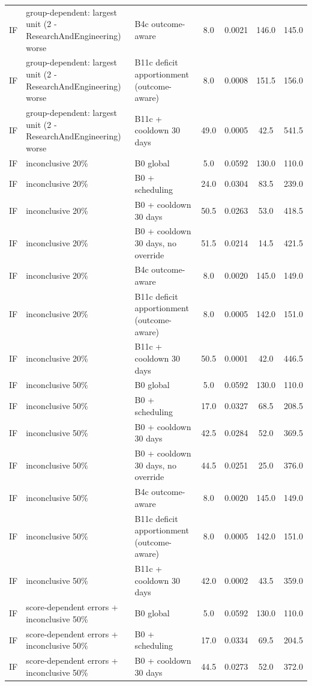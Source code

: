\documentclass[10pt,onecolumn,letterpaper]{article}
\begin{document}
\begin{longtable}{lp{5.2cm}p{4.4cm}cccc}
IF & group-dependent: largest unit (2 - ResearchAndEngineering) worse & B4c outcome-aware & 8.0 & 0.0021 & 146.0 & 145.0 \\
IF & group-dependent: largest unit (2 - ResearchAndEngineering) worse & B11c deficit apportionment (outcome-aware) & 8.0 & 0.0008 & 151.5 & 156.0 \\
IF & group-dependent: largest unit (2 - ResearchAndEngineering) worse & B11c + cooldown 30 days & 49.0 & 0.0005 & 42.5 & 541.5 \\
IF & inconclusive 20\% & B0 global & 5.0 & 0.0592 & 130.0 & 110.0 \\
IF & inconclusive 20\% & B0 + scheduling & 24.0 & 0.0304 & 83.5 & 239.0 \\
IF & inconclusive 20\% & B0 + cooldown 30 days & 50.5 & 0.0263 & 53.0 & 418.5 \\
IF & inconclusive 20\% & B0 + cooldown 30 days, no override & 51.5 & 0.0214 & 14.5 & 421.5 \\
IF & inconclusive 20\% & B4c outcome-aware & 8.0 & 0.0020 & 145.0 & 149.0 \\
IF & inconclusive 20\% & B11c deficit apportionment (outcome-aware) & 8.0 & 0.0005 & 142.0 & 151.0 \\
IF & inconclusive 20\% & B11c + cooldown 30 days & 50.5 & 0.0001 & 42.0 & 446.5 \\
IF & inconclusive 50\% & B0 global & 5.0 & 0.0592 & 130.0 & 110.0 \\
IF & inconclusive 50\% & B0 + scheduling & 17.0 & 0.0327 & 68.5 & 208.5 \\
IF & inconclusive 50\% & B0 + cooldown 30 days & 42.5 & 0.0284 & 52.0 & 369.5 \\
IF & inconclusive 50\% & B0 + cooldown 30 days, no override & 44.5 & 0.0251 & 25.0 & 376.0 \\
IF & inconclusive 50\% & B4c outcome-aware & 8.0 & 0.0020 & 145.0 & 149.0 \\
IF & inconclusive 50\% & B11c deficit apportionment (outcome-aware) & 8.0 & 0.0005 & 142.0 & 151.0 \\
IF & inconclusive 50\% & B11c + cooldown 30 days & 42.0 & 0.0002 & 43.5 & 359.0 \\
IF & score-dependent errors + inconclusive 50\% & B0 global & 5.0 & 0.0592 & 130.0 & 110.0 \\
IF & score-dependent errors + inconclusive 50\% & B0 + scheduling & 17.0 & 0.0334 & 69.5 & 204.5 \\
IF & score-dependent errors + inconclusive 50\% & B0 + cooldown 30 days & 44.5 & 0.0273 & 52.0 & 372.0 \\

\end{longtable}
\end{document}
